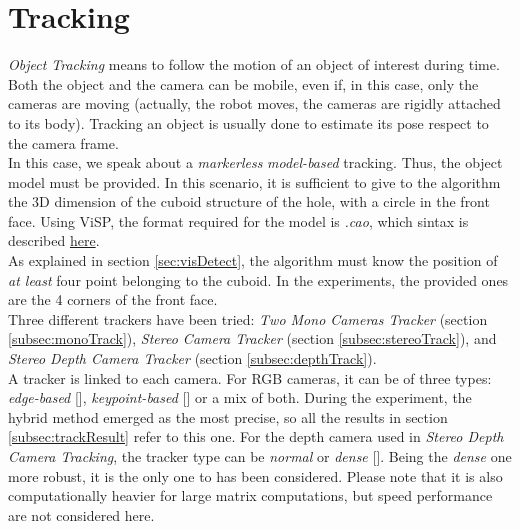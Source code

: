 \section{Tracking}
\label{sec:visTracking}
\textit{Object Tracking} means to follow the motion of an object of interest during time. Both the object and the camera can be mobile, even if, in this case, only the cameras are moving (actually, the robot moves, the cameras are rigidly attached to its body). Tracking an object is usually done to estimate its pose respect to the camera frame.\\
In this case, we speak about a \textit{markerless} \textit{model-based} tracking. Thus, the object model must be provided. In this scenario, it is sufficient to give to the algorithm the 3D dimension of the cuboid structure of the hole, with a circle in the front face. Using ViSP, the format required for the model is \textit{.cao}, which sintax is described \href{https://visp-doc.inria.fr/doxygen/visp-daily/tutorial-tracking-mb-generic.html#mb_generic_advanced_cao}{here}.\\
As explained in section \ref{sec:visDetect}, the algorithm must know the position of \textit{at least} four point belonging to the cuboid. In the experiments, the provided ones are the 4 corners of the front face.\\

Three different trackers have been tried: \textit{Two Mono Cameras Tracker} (section \ref{subsec:monoTrack}), \textit{Stereo Camera Tracker} (section \ref{subsec:stereoTrack}), and \textit{Stereo Depth Camera Tracker} (section \ref{subsec:depthTrack}).\\
A tracker is linked to each camera. For RGB cameras, it can be of three types: \textit{edge-based} [\cite{visp-edge}], \textit{keypoint-based} [\cite{visp-klt}] or a mix of both. During the experiment, the hybrid method emerged as the most precise, so all the results in section \ref{subsec:trackResult} refer to this one.
For the depth camera used in \textit{Stereo Depth Camera Tracking}, the tracker type can be \textit{normal} or \textit{dense} [\cite{visp-depth}]. Being the \textit{dense} one more robust, it is the only one to has been considered. Please note that it is also computationally heavier for large matrix computations, but speed performance are not considered here.

